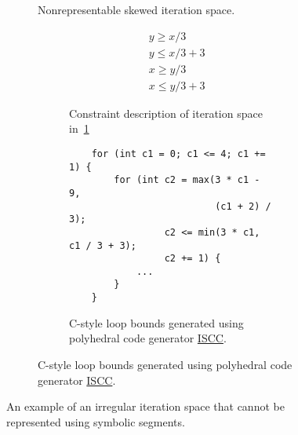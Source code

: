 \begin{figure}
	\begin{subfigure}{0.5\columnwidth}
	\caption{Nonrepresentable skewed iteration space.}\label{skewedIterationSpace}
	\end{subfigure}
	\begin{subfigure}{0.5\columnwidth}
	\begin{subfigure}{\columnwidth}
	\begin{align}
		&y \geq x/3 \\
		&y \leq x/3 + 3 \\
		&x \geq y/3 \\
		&x \leq y/3 + 3
	\end{align}
	\caption{Constraint description of iteration space in~\ref{skewedIterationSpace}}\label{constraintDescription3}
	\end{subfigure}
	
	\begin{subfigure}{\columnwidth}
	\begin{lstlisting}
	for (int c1 = 0; c1 <= 4; c1 += 1) {
		for (int c2 = max(3 * c1 - 9, 
		                  (c1 + 2) / 3); 
				 c2 <= min(3 * c1, c1 / 3 + 3); 
				 c2 += 1) {
			...
		}
	}
	\end{lstlisting}
	\caption{C-style loop bounds generated using polyhedral code generator \href{https://compsys-tools.ens-lyon.fr/iscc/index.php}{ISCC}.}\label{farkasResult}
	\end{subfigure}
	
	\end{subfigure}
	\caption{An example of an irregular iteration space that cannot be represented using symbolic segments.}\label{badShapes}
	\end{figure}
\begin{comment}
Domain := [n] -> {
	T[x,y] : y >= x/3 and y <= (x+9) / 3 and x >= y/3 and x <= (y+9) / 3;
};
Schedule := [n] -> {
    T[i, j] -> [1, i, j];
};
codegen (Schedule * Domain);
\end{comment}


